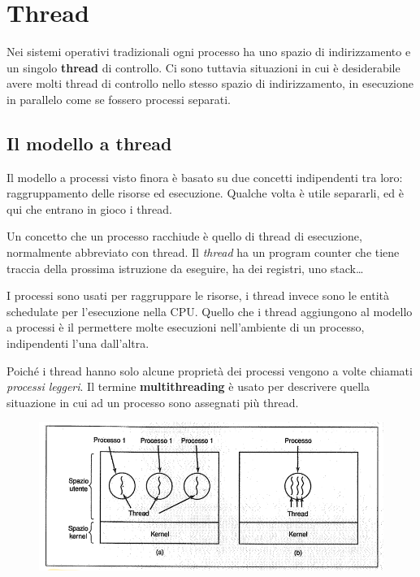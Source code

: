 \chapter{Thread}
\thispagestyle{empty}

Nei sistemi operativi tradizionali ogni processo ha uno spazio di indirizzamento e un singolo \textbf{thread} di controllo. Ci sono tuttavia situazioni in cui è desiderabile avere molti thread di controllo nello stesso spazio di indirizzamento, in esecuzione in parallelo come se fossero processi separati.

\section{Il modello a thread}
Il modello a processi visto finora è basato su due concetti indipendenti tra loro: raggruppamento delle risorse ed esecuzione. Qualche volta è utile separarli, ed è qui che entrano in gioco i thread.

Un concetto che un processo racchiude è quello di thread di esecuzione, normalmente abbreviato con thread. Il \textit{thread} ha un program counter che tiene traccia della prossima istruzione da eseguire, ha dei registri, uno stack\dots

I processi sono usati per raggruppare le risorse, i thread invece sono le entità schedulate per l'esecuzione nella CPU.
Quello che i thread aggiungono al modello a processi è il permettere molte esecuzioni nell'ambiente di un processo, indipendenti l'una dall'altra.

Poiché i thread hanno solo alcune proprietà dei processi vengono a volte chiamati \textit{processi leggeri}. Il termine \textbf{multithreading} è usato per descrivere quella situazione in cui ad un processo sono assegnati più thread.

\begin{figure}[H]
    \centering
    \includegraphics[width=0.9\linewidth]{assets/multi5.png}
    \caption{ }
    \label{multi5}
\end{figure}

